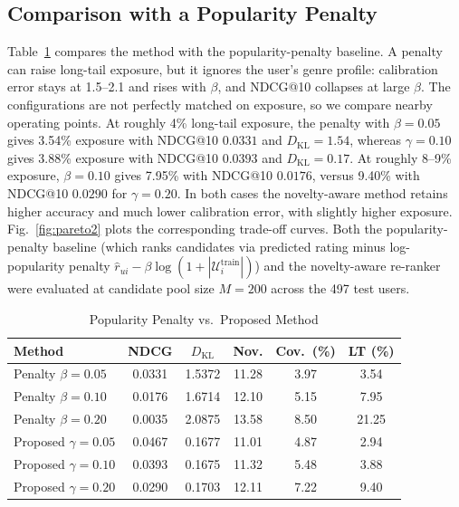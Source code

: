 \documentclass[conference]{IEEEtran}
\newcommand{\KL}{D_{\mathrm{KL}}}
\begin{document}
  \subsection{Comparison with a Popularity Penalty}
  Table~\ref{tab:pen} compares the method with the popularity-penalty baseline. A penalty can raise long-tail exposure, but it ignores the user's genre profile: calibration error stays at 1.5--2.1 and rises with $\beta$, and NDCG@10 collapses at large $\beta$. The configurations are not perfectly matched on exposure, so we compare nearby operating points. At roughly 4\% long-tail exposure, the penalty with $\beta=0.05$ gives 3.54\% exposure with NDCG@10 $0.0331$ and $\KL=1.54$, whereas $\gamma=0.10$ gives 3.88\% exposure with NDCG@10 $0.0393$ and $\KL=0.17$. At roughly 8--9\% exposure, $\beta=0.10$ gives 7.95\% with NDCG@10 $0.0176$, versus 9.40\% with NDCG@10 $0.0290$ for $\gamma=0.20$. In both cases the novelty-aware method retains higher accuracy and much lower calibration error, with slightly higher exposure. Fig.~\ref{fig:pareto2} plots the corresponding trade-off curves. Both the popularity-penalty baseline (which ranks candidates via predicted rating minus log-popularity penalty $\widehat{r}_{ui} - \beta \log(1 + |\mathcal{U}_i^{\mathrm{train}}|)$) and the novelty-aware re-ranker were evaluated at candidate pool size $M=200$ across the 497 test users.

  \begin{table}[t]
  \centering
  \caption{Popularity Penalty vs.\ Proposed Method}
  \label{tab:pen}
  \renewcommand{\arraystretch}{1.1}
  \footnotesize
  \begin{tabular}{@{}lccccc@{}}
  \toprule
  \textbf{Method} & \textbf{NDCG} & \textbf{$\KL$} & \textbf{Nov.} & \textbf{Cov.\ (\%)} & \textbf{LT (\%)}\\
  \midrule
  Penalty $\beta=0.05$ & 0.0331 & 1.5372 & 11.28 & 3.97 & 3.54\\
  Penalty $\beta=0.10$ & 0.0176 & 1.6714 & 12.10 & 5.15 & 7.95\\
  Penalty $\beta=0.20$ & 0.0035 & 2.0875 & 13.58 & 8.50 & 21.25\\
  Proposed $\gamma=0.05$ & 0.0467 & 0.1677 & 11.01 & 4.87 & 2.94\\
  Proposed $\gamma=0.10$ & 0.0393 & 0.1675 & 11.32 & 5.48 & 3.88\\
  Proposed $\gamma=0.20$ & 0.0290 & 0.1703 & 12.11 & 7.22 & 9.40\\
  \bottomrule
  \end{tabular}
  \end{table}
\end{document}
